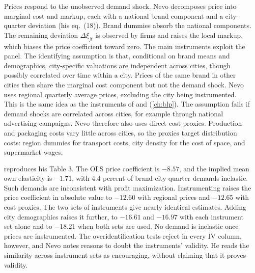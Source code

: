  Prices respond to the unobserved demand shock. Nevo decomposes price into
marginal cost and markup, each with a national brand component and a city-quarter deviation (his eq.~(18)). Brand
dummies absorb the national components. The remaining deviation $\Delta\xi_{jt}$ is observed by firms and raises the
local markup, which biases the price coefficient toward zero. The main instruments exploit the panel. The identifying
assumption is that, conditional on brand means and demographics, city-specific valuations are independent across
cities, though possibly correlated over time within a city. Prices of the same brand in other cities then share the
marginal cost component but not the demand shock. Nevo uses regional quarterly average prices, excluding the city being
instrumented. This is the same idea as the instruments of \citet{Hausman1997} and \citet{Nevo2001} (\cref{ch:blp}). The
assumption fails if demand shocks are correlated across cities, for example through national advertising campaigns.
Nevo therefore also uses direct cost proxies. Production and packaging costs vary little across cities, so the proxies
target distribution costs: region dummies for transport costs, city density for the cost of space, and supermarket wages.

  reproduces his Table 3. The OLS price coefficient is $-8.57$, and
the implied mean own elasticity is $-1.71$, with 4.4 percent of brand-city-quarter demands inelastic. Such demands are
inconsistent with profit maximization. Instrumenting raises the price coefficient in absolute value to $-12.60$ with
regional prices and $-12.65$ with cost proxies. The two sets of instruments give nearly identical estimates. Adding
city demographics raises it further, to $-16.61$ and $-16.97$ with each instrument set alone and to $-18.21$ when
both sets are used. No demand is
inelastic once prices are instrumented. The overidentification tests reject in every IV column, however, and Nevo notes
reasons to doubt the instruments' validity. He reads the similarity across instrument sets as encouraging, without
claiming that it proves validity.

